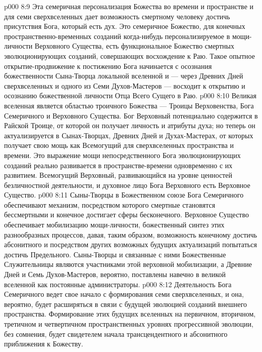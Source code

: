 \vs p000 8:9 \pc Эта семеричная персонализация Божества во времени и пространстве и для семи сверхвселенных дает возможность смертному человеку достичь присутствия Бога, который есть дух. Это семеричное Божество, для конечных пространственно\hyp{}временных созданий когда\hyp{}нибудь персонализируемое в мощи\hyp{}личности Верховного Существа, есть функциональное Божество смертных эволюционирующих созданий, совершающих восхождение к Раю. Такое опытное открытие\hyp{}продвижение к постижению Бога начинается с осознания божественности Сына\hyp{}Творца локальной вселенной и --- через Древних Дней сверхвселенных и одного из Семи Духов\hyp{}Мастеров --- восходит к открытию и осознанию божественной личности Отца Всего Сущего в Раю.
\vs p000 8:10 \pc Великая вселенная является областью троичного Божества --- Троицы Верховенства, Бога Семеричного и Верховного Существа. Бог Верховный потенциально содержится в Райской Троице, от которой он получает личность и атрибуты духа; но теперь он актуализируется в Сынах\hyp{}Творцах, Древних Дней и Духах\hyp{}Мастерах, от которых получает свою мощь как Всемогущий для сверхвселенных пространства и времени. Это выражение мощи непосредственного Бога эволюционирующих созданий реально развивается в пространстве\hyp{}времени одновременно с их развитием. Всемогущий Верховный, развивающийся на уровне ценностей безличностной деятельности, и духовное лицо Бога Верховного есть  Верховное Существо.
\vs p000 8:11 Сыны\hyp{}Творцы в Божественном союзе Бога Семеричного обеспечивают механизм, посредством которого смертные становятся бессмертными и конечное достигает сферы бесконечного. Верховное Существо обеспечивает мобилизацию мощи\hyp{}личности, божественный синтез  этих разнообразных процессов, давая, таким образом, возможность конечному достичь абсонитного и посредством других возможных будущих актуализаций попытаться достичь Предельного. Сыны\hyp{}Творцы и связанные с ними Божественные Служительницы являются участниками этой верховной мобилизации, а Древние Дней и Семь Духов\hyp{}Мастеров, вероятно, поставлены навечно в великой вселенной как постоянные администраторы.
\vs p000 8:12 Деятельность Бога Семеричного ведет свое начало с формирования семи сверхвселенных, и она, вероятно, будет расширяться в связи с будущей эволюцией созданий внешнего пространства. Формирование этих будущих вселенных на первичном, вторичном, третичном и четвертичном пространственных уровнях прогрессивной эволюции, без сомнения, будет свидетелем начала трансцендентного и абсонитного приближения к Божеству.
